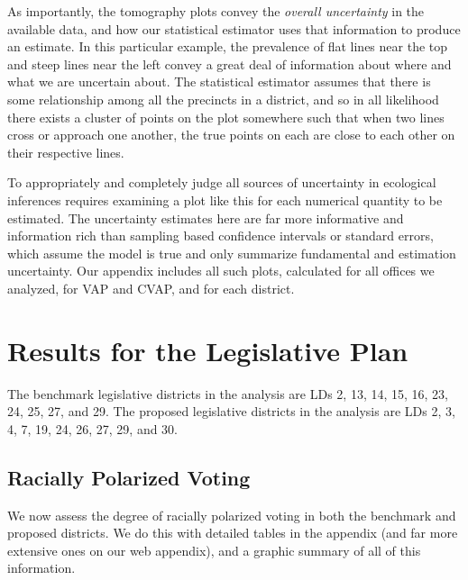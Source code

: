 \documentclass[12pt]{article}
\begin{document}
As importantly, the tomography plots convey the \emph{overall
  uncertainty} in the available data, and how our statistical
estimator uses that information to produce an estimate.  In this
particular example, the prevalence of flat lines near the top and
steep lines near the left convey a great deal of information about
where and what we are uncertain about.  The statistical estimator
assumes that there is some relationship among all the precincts in a
district, and so in all likelihood there exists a cluster of points on
the plot somewhere such that when two lines cross or approach one
another, the true points on each are close to each other on their
respective lines.  

To appropriately and completely judge all sources of uncertainty in
ecological inferences requires examining a plot like this for each
numerical quantity to be estimated.  The uncertainty estimates here
are far more informative and information rich than sampling based
confidence intervals or standard errors, which assume the model is
true and only summarize fundamental and estimation uncertainty.  Our
appendix includes all such plots, calculated for all offices we
analyzed, for VAP and CVAP, and for each district.

\section{Results for the Legislative Plan}\label{s:res}

The benchmark legislative districts in the analysis are LDs 2, 13, 14, 15, 16, 23, 24, 25, 27, and 29. The proposed legislative districts in the analysis are LDs 2, 3, 4, 7, 19, 24, 26, 27, 29, and 30. 

\subsection{Racially Polarized Voting}

We now assess the degree of racially polarized voting in both the
benchmark and proposed districts.  We do this with detailed tables in
the appendix (and far more extensive ones on our web appendix), and a
graphic summary of all of this information.

\end{document}
